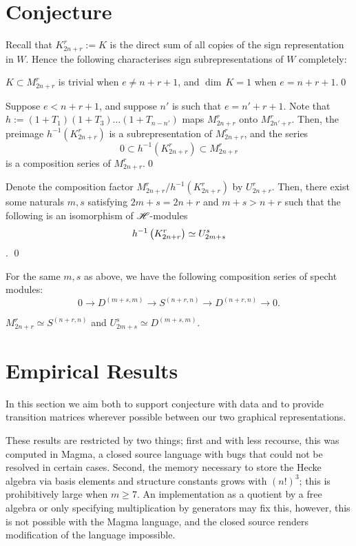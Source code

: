 \documentclass{amsart}
\begin{document}
\section{Conjecture}\label{Conjecture Section}
Recall that $K_{2n + r}^r := K$ is the direct sum of all copies of the sign representation in $W$.
Hence the following characterises sign subrepresentations of $W$ completely:
\begin{proposition}
  $K \subset M_{2n + r}^r$ is trivial when $e \neq n + r + 1$, and $\dim \, K = 1$ when $e = n + r + 1$.\qed
\end{proposition} 
\begin{proposition}
  Suppose $e < n + r + 1$, and suppose $n'$ is such that $e = n' + r + 1$.
  Note that $h := (1 + T_1)(1 + T_3)\dots(1 + T_{n - n'})$ maps $M_{2n + r}^r$ onto $M_{2n' + r}^r$.
  Then, the preimage $h^{-1}(K_{2n + r}^r)$ is a subrepresentation of $M_{2n + r}^r$, and the series
  \[
    0 \subset h^{-1}(K_{2n + r}^r) \subset M_{2n + r}^r
  \]
  is a composition series of $M_{2n + r}^r$.\qed
\end{proposition}
\begin{proposition}
  Denote the composition factor $M_{2n + r}^r / h^{-1}(K_{2n + r}^r)$ by $U_{2n + r}^r$.
  Then, there exist some naturals $m,s$ satisfying $2m + s = 2n + r$ and $m + s > n + r$ such that the following is an isomorphism of $\mathscr{H}$-modules \[h^{-1}\left( K_{2n + r}^r \right) \simeq U_{2m + s}^s\].
  \qed
\end{proposition}
\begin{proposition}
  For the same $m,s$ as above, we have the following composition series of specht modules:
  \[
    0 \longrightarrow D^{(m+s,m)} \longrightarrow S^{(n+r,n)} \longrightarrow D^{(n+r,n)} \longrightarrow 0.
  \]
\end{proposition}
\begin{proposition}
  $M_{2n + r}^r \simeq S^{(n+r,n)}$ and $U_{2m +s}^s \simeq D^{(m+s,m)}$.
\end{proposition}

\section{Empirical Results}\label{Empirics Section}
In this section we aim both to support conjecture with data and to provide transition matrices wherever possible between our two graphical representations.\cite{Github}

\begin{remark}
  These results are restricted by two things; first and with less recourse, this was computed in Magma, a closed source language with bugs that could not be resolved in certain cases.
  Second, the memory necessary to store the Hecke algebra via basis elements and structure constants grows with $(n!)^3$;
  this is prohibitively large when $m \geq 7$.
  An implementation as a quotient by a free algebra or only specifying multiplication by generators may fix this, however, this is not possible with the Magma language, and the closed source renders modification of the language impossible.
\end{remark}
\end{document}
